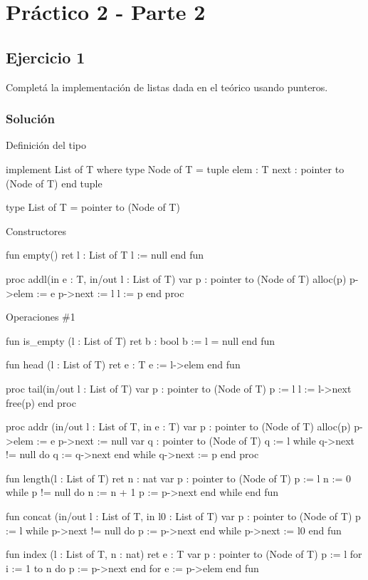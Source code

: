 \chapter{Práctico 2 - Parte 2}

\section{Ejercicio 1}
Completá la implementación de listas dada en el teórico usando punteros.

\subsection{Solución}
\begin{codebox}{Definición del tipo}
\begin{pascallike}
implement List of T where
type Node of T = tuple
                   elem : T
                   next : pointer to (Node of T)
                 end tuple

type List of T = pointer to (Node of T)

\end{pascallike}
\end{codebox}

\begin{codebox}{Constructores}
\begin{pascallike}
fun empty() ret l : List of T
    l := null
end fun

proc addl(in e : T, in/out l : List of T)
    var p : pointer to (Node of T)
    alloc(p)
    p->elem := e
    p->next := l
    l := p
end proc
\end{pascallike}
\end{codebox}

\begin{codebox}{Operaciones \#1}
\begin{pascallike}
fun is_empty (l : List of T) ret b : bool
    b := l = null
end fun

fun head (l : List of T) ret e : T
    e := l->elem
end fun

proc tail(in/out l : List of T)
    var p : pointer to (Node of T)
    p := l
    l := l->next
    free(p)
end proc

proc addr (in/out l : List of T, in e : T)
    var p : pointer to (Node of T)
    alloc(p)
    p->elem := e
    p->next := null
    var q : pointer to (Node of T)
    q := l
    while q->next != null do
        q := q->next
    end while
    q->next := p
end proc

fun length(l : List of T) ret n : nat
    var p : pointer to (Node of T)
    p := l
    n := 0
    while p != null do
        n := n + 1
        p := p->next
    end while
end fun

fun concat (in/out l : List of T, in l0 : List of T)
    var p : pointer to (Node of T)
    p := l
    while p->next != null do
        p := p->next
    end while
    p->next := l0
end fun

fun index (l : List of T, n : nat) ret e : T
    var p : pointer to (Node of T)
    p := l
    for i := 1 to n do
        p := p->next
    end for
    e := p->elem
end fun
\end{pascallike}
\end{codebox}

